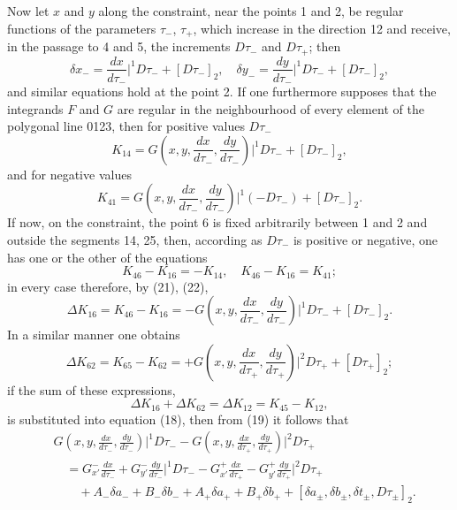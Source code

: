 \documentclass[11pt,a4paper,leqno]{article}
\begin{document}
Now let $x$ and $y$ along the constraint, near the points 1 and 2, be regular functions of the parameters $\tau_-$, $\tau_+$, which increase in the direction 12 and receive, in the passage to 4 and 5, the increments $D\tau_-$ and $D\tau_+$; then
\[
\delta x_- =\frac{dx}{d\tau_-}\bigg|^1D\tau_-+[D\tau_-]_2,
\quad
\delta y_- =\frac{dy}{d\tau_-}\bigg|^1D\tau_-+[D\tau_-]_2,
\]
and similar equations hold at the point 2. If one furthermore supposes that the integrands $F$ and $G$ are regular in the neighbourhood of every element of the polygonal line 0123, then for positive values $D\tau_-$
\begin{equation}\tag{21}
K_{14}=G\left(x,y,\frac{dx}{d\tau_-},\frac{dy}{d\tau_-}\right)\bigg|^1D\tau_-+[D\tau_-]_2,
\end{equation}
and for negative values
\begin{equation}\tag{22}
K_{41}=G\left(x,y,\frac{dx}{d\tau_-},\frac{dy}{d\tau_-}\right)\bigg|^1(-D\tau_-)+[D\tau_-]_2.
\end{equation}
If now, on the constraint, the point 6 is fixed arbitrarily between 1 and 2 and outside the segments 14, 25, then, according as $D\tau_-$ is positive or negative, one has one or the other of the equations
\[
K_{46}-K_{16}=-K_{14},
\quad
K_{46}-K_{16}=K_{41};
\]
in every case therefore, by (21), (22),
\begin{equation}\tag{23}
\Delta K_{16}=K_{46}-K_{16}
=-G\left(x,y,\frac{dx}{d\tau_-},\frac{dy}{d\tau_-}\right)\bigg|^1D\tau_-+[D\tau_-]_2.
\end{equation}
In a similar manner one obtains
\begin{equation}\tag{24}
\Delta K_{62}=K_{65}-K_{62}
=+G\left(x,y,\frac{dx}{d\tau_+},\frac{dy}{d\tau_+}\right)\bigg|^2D\tau_+ +[D\tau_+]_2;
\end{equation}
if the sum of these expressions,
\[
\Delta K_{16}+\Delta K_{62}=\Delta K_{12}=K_{45}-K_{12},
\]
is substituted into equation (18), then from (19) it follows that
\begin{equation}\tag{25}
\begin{aligned}
&G\left(x,y,\frac{dx}{d\tau_-},\frac{dy}{d\tau_-}\right)\bigg|^1D\tau_-
-G\left(x,y,\frac{dx}{d\tau_+},\frac{dy}{d\tau_+}\right)\bigg|^2D\tau_+\\
&\quad=G_{x'}^-\frac{dx}{d\tau_-}+G_{y'}^-\frac{dy}{d\tau_-}\bigg|^1D\tau_-
-G_{x'}^+\frac{dx}{d\tau_+}-G_{y'}^+\frac{dy}{d\tau_+}\bigg|^2D\tau_+\\
&\qquad +A_-\delta a_-+B_-\delta b_-+A_+\delta a_+ +B_+\delta b_+
+[\delta a_\pm,\delta b_\pm,\delta t_\pm,D\tau_\pm]_2.
\end{aligned}
\end{equation}
\end{document}
